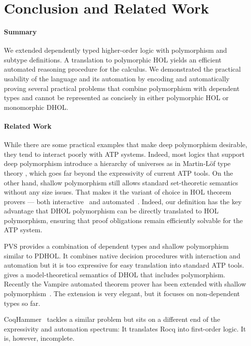 \section{Conclusion and Related Work}
\paragraph*{Summary}
We extended dependently typed higher-order logic with polymorphism and subtype definitions.
A translation to polymorphic HOL yields an efficient automated reasoning procedure for the calculus.
We demonstrated the practical usability of the language and its automation by encoding and automatically proving several practical problems that combine polymorphism with dependent types and cannot be represented as concisely in either polymorphic HOL or monomorphic DHOL.

\paragraph*{Related Work}
While there are some practical examples that make deep polymorphism desirable, they tend to interact poorly with ATP systems.
Indeed, most logics that support deep polymorphism introduce a hierarchy of universes as in Martin-L\"of type theory \cite{martinlof}, which goes far beyond the expressivity of current ATP tools.
On the other hand, shallow polymorphism still allows standard set-theoretic semantics without any size issues.
That makes it the variant of choice in HOL theorem provers --- both interactive~\cite{hol,isabellehol,hollight} and automated~\cite{SWB17,vampire,V+22}.
Indeed, our definition has the key advantage that DHOL polymorphism can be directly translated to HOL polymorphism, ensuring that proof obligations remain efficiently solvable for the ATP system.

PVS \cite{pvs} provides a combination of dependent types and shallow polymorphism 
similar to PDHOL.
It combines native decision procedures with interaction and automation but it is too expressive for easy translation into standard ATP tools.
\cite{rabe:dholmodels:26} gives a model-theoretical semantics of DHOL that includes polymorphism.
Recently the Vampire automated theorem prover has been extended with shallow
polymorphism~\cite{BR20}. The extension is very elegant, but it focuses on non-dependent types
so far.

CoqHammer~\cite{CK18} tackles a similar problem but sits on a different end of the
expressivity and automation spectrum: It translates 
Rocq into first-order logic.
It is, however, incomplete.

